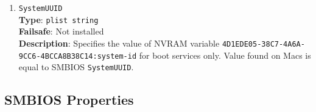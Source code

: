 \documentclass[]{article}
\begin{document}
\begin{enumerate}
\item
  \texttt{SystemUUID}\\
  \textbf{Type}: \texttt{plist\ string}\\
  \textbf{Failsafe}: Not installed\\
  \textbf{Description}: Specifies the value of NVRAM variable
  \texttt{4D1EDE05-38C7-4A6A-9CC6-4BCCA8B38C14:system-id}
  for boot services only. Value found on Macs is equal to SMBIOS
  \texttt{SystemUUID}.

\end{enumerate}

\subsection{SMBIOS Properties}\label{platforminfosmbios}
\end{document}
